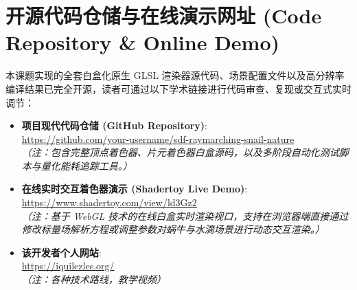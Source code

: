 \documentclass[11pt, a4paper, oneside]{report}
\newcommand{\keyword}[1]{\textbf{#1}}
\begin{document}
\section{开源代码仓储与在线演示网址 (Code Repository \& Online Demo)}
本课题实现的全套白盒化原生 GLSL 渲染器源代码、场景配置文件以及高分辨率编译结果已完全开源，读者可通过以下学术链接进行代码审查、复现或交互式实时调节：

\begin{itemize}
    \item \keyword{项目现代代码仓储 (GitHub Repository)}: \\
    \url{https://github.com/your-username/sdf-raymarching-snail-nature} \\
    \textit{（注：包含完整顶点着色器、片元着色器白盒源码，以及多阶段自动化测试脚本与量化能耗追踪工具。）}
    
    \item \keyword{在线实时交互着色器演示 (Shadertoy Live Demo)}: \\
    \url{https://www.shadertoy.com/view/ld3Gz2} \\
    \textit{（注：基于 WebGL 技术的在线白盒实时渲染视口，支持在浏览器端直接通过修改标量场解析方程或调整参数对蜗牛与水滴场景进行动态交互渲染。）}

    \item \keyword{该开发者个人网站}: \\
    \url{https://iquilezles.org/} \\
    \textit{（注：各种技术路线，教学视频）}
\end{itemize}
\end{document}

